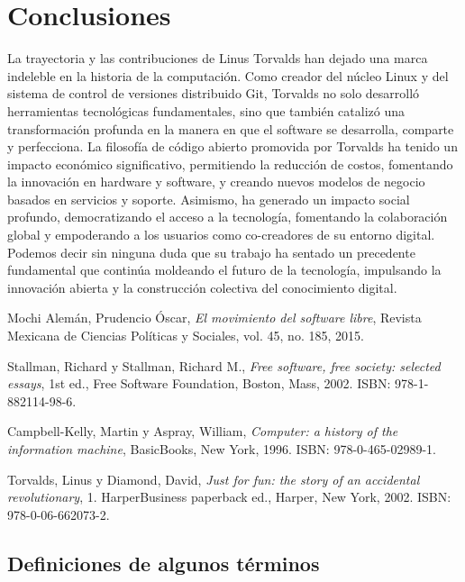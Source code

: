 \documentclass[a4paper,12pt]{article}
\begin{document}
\section{Conclusiones}
La trayectoria y las contribuciones de Linus Torvalds han dejado una marca
indeleble en la historia de la computación. Como creador del núcleo Linux y del
sistema de control de versiones distribuido Git, Torvalds no solo desarrolló
herramientas tecnológicas fundamentales, sino que también catalizó una
transformación profunda en la manera en que el software se desarrolla, comparte
y perfecciona.
La filosofía de código abierto promovida por Torvalds ha tenido un impacto
económico significativo, permitiendo la reducción de costos, fomentando la
innovación en hardware y software, y creando nuevos modelos de negocio basados
en servicios y soporte. Asimismo, ha generado un impacto social profundo,
democratizando el acceso a la tecnología, fomentando la colaboración global y
empoderando a los usuarios como co-creadores de su entorno digital.
Podemos decir sin ninguna duda que su trabajo ha sentado un precedente
fundamental que continúa moldeando el futuro de la tecnología, impulsando la
innovación abierta y la construcción colectiva del conocimiento digital.


\newpage

\begin{thebibliography}{9}

Mochi Alemán, Prudencio Óscar, \textit{El movimiento del software libre},
Revista Mexicana de Ciencias Políticas y Sociales, vol. 45, no. 185, 2015.

Stallman, Richard y Stallman, Richard M., \textit{Free software, free society:
selected essays}, 1st ed., Free Software Foundation, Boston, Mass, 2002. ISBN:
978-1-882114-98-6.

Campbell-Kelly, Martin y Aspray, William, \textit{Computer: a history of the
information machine}, BasicBooks, New York, 1996. ISBN: 978-0-465-02989-1.

Torvalds, Linus y Diamond, David, \textit{Just for fun: the story of an
accidental revolutionary}, 1. HarperBusiness paperback ed., Harper, New York,
2002. ISBN: 978-0-06-662073-2.

\end{thebibliography}
\newpage

\subsection*{Definiciones de algunos términos} 
\end{document}
